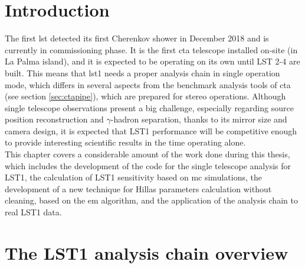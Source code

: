 \documentclass[main.tex]{subfiles}
\begin{document}
\glsresetall

\section{Introduction}

The first \gls{lst} detected its first Cherenkov shower in December 2018 and is currently in commissioning phase. It is the first \gls{cta} telescope installed on-site (in La Palma island), and it is expected to be operating on its own until LST 2-4 are built. This means that \gls{lst}1 needs a proper analysis chain in single operation mode, which differs in several aspects from the benchmark analysis tools of \gls{cta} (see section \ref{sec:ctapipe}), which are prepared for stereo operations. Although single telescope observations present a big challenge, especially regarding source position reconstruction and $\gamma$-hadron separation, thanks to its mirror size and camera design, it is expected that LST1 performance will be competitive enough to provide interesting scientific results in the time operating alone.\\
This chapter covers a considerable amount of the work done during this thesis, which includes the development of the code for the single telescope analysis for LST1, the calculation of LST1 sensitivity based on \gls{mc} simulations, the development of a new technique for Hillas parameters calculation without cleaning, based on the \gls{em} algorithm, and the application of the analysis chain to real LST1 data.

\section{The LST1 analysis chain overview} \label{sec:anachain}
\end{document}
